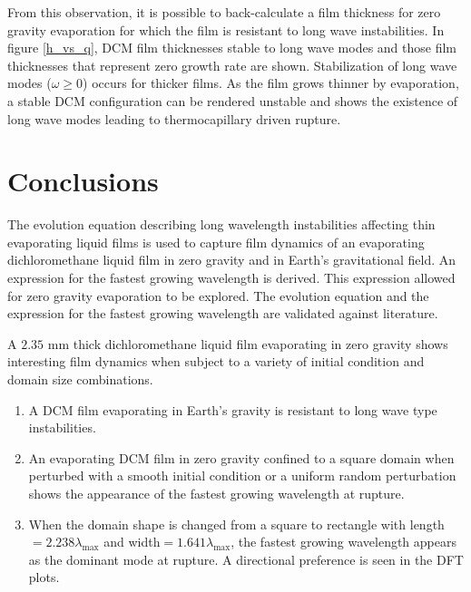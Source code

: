 \documentclass[a4paper,12pt]{article}
\begin{document}

From this observation, it is possible to back-calculate a film thickness for zero gravity evaporation for which the film is resistant to long wave instabilities. In figure \ref{h_vs_q}, DCM film thicknesses stable to long wave modes and those film thicknesses that represent zero growth rate are shown. Stabilization of long wave modes ($\omega \geq 0$) occurs for thicker films. As the film grows thinner by evaporation, a stable DCM configuration can be rendered unstable and shows the existence of long wave modes leading to thermocapillary driven rupture.

\section{Conclusions}

The evolution equation describing long wavelength instabilities affecting thin evaporating liquid films is used to capture film dynamics of an evaporating dichloromethane liquid film in zero gravity and in Earth's gravitational field. An expression for the fastest growing wavelength is derived. This expression allowed for zero gravity evaporation to be explored. The evolution equation and the expression for the fastest growing wavelength are validated against literature.

A $2.35$ mm thick dichloromethane liquid film evaporating in zero gravity shows interesting film dynamics when subject to a variety of initial condition and domain size combinations.

\begin{enumerate}
\item A DCM film evaporating in Earth's gravity is resistant to long wave type instabilities.
\item An evaporating DCM film in zero gravity confined to a square domain when perturbed with a smooth initial condition or a uniform random perturbation shows the appearance of the fastest growing wavelength at rupture.
\item When the domain shape is changed from a square to rectangle with length$=2.238\lambda_\text{max}$ and width$=1.641\lambda_\text{max}$, the fastest growing wavelength appears as the dominant mode at rupture. A directional preference is seen in the DFT plots.
\end{enumerate}
\end{document}
